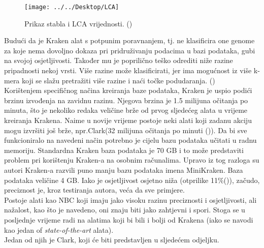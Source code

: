 \documentclass[times, utf8, seminar]{fer}
\begin{document}
\begin{figure}
	\centering
	\texttt{[image: ../../Desktop/LCA]}
	\caption{Prikaz stabla i LCA vrijednosti. (\cite{Zavrsni})}
	\label{fig:lca}
\end{figure}
Budući da je Kraken alat s potpunim poravnanjem, tj. ne klasificira one genome za koje nema dovoljno dokaza pri pridruživanju podacima u bazi podataka, gubi na svojoj osjetljivosti. Također mu je poprilično teško odrediti niže razine pripadnosti nekoj vrsti. Više razine može klasificirati, jer ima mogućnost iz više k-mera koji se slažu pretražiti više razine i naći točke podudaranja. (\cite{Kraken})
\\Korištenjem specifičnog načina kreiranja baze podataka, Kraken je uspio podići brzinu izvođenja na zavidnu razinu. Njegova brzina je 1.5 milijuna očitanja po minuta, što je nekoliko redaka veličine brže od prvog sljedećeg alata u vrijeme kreiranja Krakena. Naime u novije vrijeme postoje neki alati koji zadanu akciju mogu izvršiti još brže, npr.Clark(32 milijuna očitanja po minuti (\cite{CLARK})). Da bi sve funkcioniralo na navedeni način potrebno je cijelu bazu podataka učitati u radnu memoriju. Standardna Kraken baza podataka je 70 GB i to može predstaviti problem pri korištenju Kraken-a na osobnim računalima.
Upravo iz tog razloga su autori Kraken-a razvili puno manju bazu podataka imena MiniKraken. Baza podataka veličine 4 GB. Iako je osjetljivost osjetno niža (otprilike 11\%(\cite{Kraken})), začudo, preciznost je, kroz testiranja autora, veća da sve primjere.
\\Postoje alati kao NBC koji imaju jako visoku razinu preciznosti i osjetljivosti, ali nažalost, kao što je navedeno, oni znaju biti jako zahtjevni i spori. Stoga se u posljednje vrijeme radi na alatima koji bi bili i bolji od Krakena (iako se navodi kao jedan of \textit{state-of-the-art} alata).
\\Jedan od njih je Clark, koji će biti predstavljen u sljedećem odjeljku.
\end{document}
